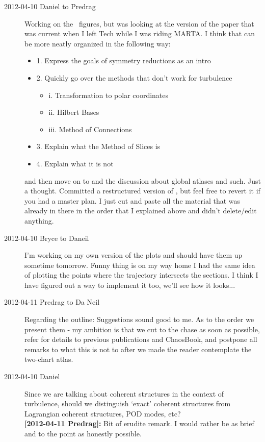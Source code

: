 \begin{description}
\item[2012-04-10 Daniel to Predrag]
Working on the \cLe\ figures, but was looking at the version of the paper
that was current when I left Tech while I was riding MARTA. I think that
 can be more neatly organized in the following way:
      \begin{itemize}
      	\item{1. Express the goals of symmetry reductions as an intro}
      	\item{2. Quickly go over the methods that don't work for turbulence}
      	\begin{itemize}
      		\item{i. Transformation to polar coordinates}
      		\item{ii. Hilbert Bases}
      		\item{iii. Method of Connections}
      	\end{itemize}
      	\item{3. Explain what the Method of Slices is}
      	\item{4. Explain what it is not}
      \end{itemize}
and then move on to  and the discussion about global
atlases and such. Just a thought. Committed a restructured version of
, but feel free to revert it if you had a master plan.
I just cut and paste all the material that was already in there in the
order that I explained above and didn't delete/edit anything.

\item[2012-04-10 Bryce to Daneil] I'm working on my own version of the
plots and should have them up sometime tomorrow. Funny thing is on my way
home I had the same idea of plotting the points where the trajectory
intersects the sections. I think I have figured out a way to implement it
too, we'll see how it looks...

\item[2012-04-11 Predrag to Da Neil] Regarding the outline: Suggestions
sound good to me. As to the order we present them - my ambition is that
we cut to the chase as soon as possible, refer for details to previous
publications and ChaosBook, and postpone all remarks to what this is not
to after we made the reader contemplate the two-chart atlas.

\item[2012-04-10 Daniel]
    Since we are talking about coherent structures in the context
    of turbulence, should we distinguish `exact' coherent structures from
    Lagrangian coherent structures, POD modes, etc?
 \\
{\bf [2012-04-11 Predrag]: } Bit of erudite remark. I would rather be as
brief and to the point as honestly possible.


\end{description}
